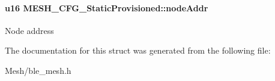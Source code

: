 \paragraph[{\texorpdfstring{node\+Addr}{nodeAddr}}]{\setlength{\rightskip}{0pt plus 5cm}u16 M\+E\+S\+H\+\_\+\+C\+F\+G\+\_\+\+Static\+Provisioned\+::node\+Addr}\hypertarget{struct_m_e_s_h___c_f_g___static_provisioned_a9127712e4b5f1cab15cb1ee1b3633bb7}{}\label{struct_m_e_s_h___c_f_g___static_provisioned_a9127712e4b5f1cab15cb1ee1b3633bb7}
Node address 

The documentation for this struct was generated from the following file\+:\begin{DoxyCompactItemize}
\item 
Mesh/ble\+\_\+mesh.\+h\end{DoxyCompactItemize}
